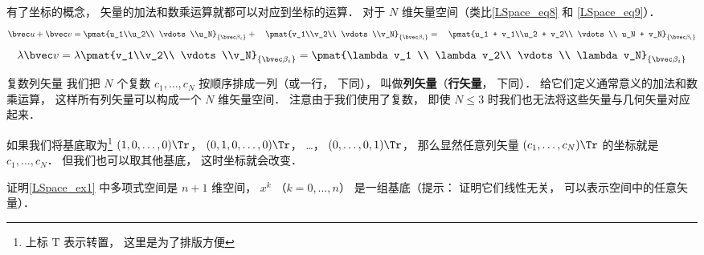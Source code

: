 有了坐标的概念， 矢量的加法和数乘运算就都可以对应到坐标的运算． 对于 $N$ 维矢量空间（类比\autoref{LSpace_eq8} 和 \autoref{LSpace_eq9}）．
\begin{equation}
\bvec u + \bvec v = \pmat{u_1\\u_2\\ \vdots\\u_N}_{\{\bvec\beta_i\}} + \quad \pmat{v_1\\v_2\\ \vdots \\v_N}_{\{\bvec\beta_i\}} = \quad \pmat{u_1 + v_1\\u_2 + v_2\\ \vdots \\ u_N + v_N}_{\{\bvec\beta_i\}}
\end{equation}
\begin{equation}
\lambda \bvec v = \lambda\pmat{v_1\\v_2\\ \vdots \\v_N}_{\{\bvec\beta_i\}} = \pmat{\lambda v_1 \\ \lambda v_2\\ \vdots \\ \lambda v_N}_{\{\bvec\beta_i\}}
\end{equation}

\begin{exercise}{复数列矢量}
我们把 $N$ 个复数 $c_1, \dots, c_N$ 按顺序排成一列（或一行， 下同）， 叫做\textbf{列矢量}（\textbf{行矢量}， 下同）． 给它们定义通常意义的加法和数乘运算， 这样所有列矢量可以构成一个 $N$ 维矢量空间． 注意由于我们使用了复数， 即使 $N \leqslant 3$ 时我们也无法将这些矢量与几何矢量对应起来．

如果我们将基底取为\footnote{上标 $\mathrm T$ 表示转置， 这里是为了排版方便} $(1, 0, \dots, 0)\Tr$， $(0, 1, 0, \dots, 0)\Tr$， …， $(0, \dots, 0, 1)\Tr$， 那么显然任意列矢量 $(c_1, \dots, c_N)\Tr$ 的坐标就是 $c_1, \dots, c_N$． 但我们也可以取其他基底， 这时坐标就会改变．
\end{exercise}

\begin{exercise}{}
证明\autoref{LSpace_ex1} 中多项式空间是 $n+1$ 维空间， $x^k$ （$k = 0, \dots, n$） 是一组基底（提示： 证明它们线性无关， 可以表示空间中的任意矢量）．
\end{exercise}
